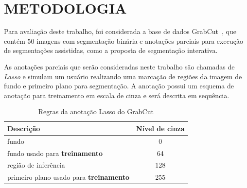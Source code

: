 \chapter{METODOLOGIA}\label{cap:metodologia}

Para avaliação deste trabalho, foi considerada a base de dados
GrabCut~\cite{rother2004grabcut}, que contém 50 imagens com segmentação
binária e anotações parciais para execução de segmentações assistidas,
como a proposta de segmentação interativa.

As anotações parciais que serão consideradas neste trabalho são
chamadas de \textit{Lasso} e simulam um usuário realizando uma
marcação de regiões da imagem de fundo e primeiro plano para
segmentação. A anotação possui um esquema de anotação para treinamento
em escala de cinza e será descrita em sequência.

\begin{figure}[h!]
        \captionsetup{width=12cm}
		\centering
\end{figure}
\FloatBarrier{}

\begin{table}[h]
  \centering
  \caption{Regras da anotação Lasso do GrabCut}\label{tab:grabcut-label}
  \begin{tabular}{lc}
    \toprule
    Descrição                                       & Nível de cinza \\
    \midrule \midrule
     fundo                                          & 0              \\
     fundo usado para \textbf{treinamento}          & 64             \\
     região de inferência                           & 128            \\
     primeiro plano usado para \textbf{treinamento} & 255            \\
    \bottomrule
  \end{tabular}
\end{table}


